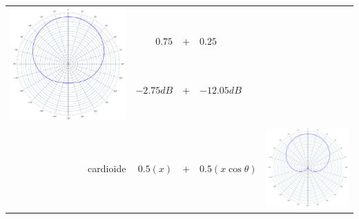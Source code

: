 \begin{table}[ht]
\begin{center}
\begin{tabular}{rrcll}
 \multirow{4}{*}{\begin{minipage}{.25\textwidth}\includegraphics[width=\linewidth]{CAPITOLI/_TIKZ/POLAR/subcardioid}\end{minipage}} \\
                & $0.75$       & $+$ & $0.25$               & \\
                & $-2.75dB$    & $+$ & $-12.05dB$           & \\
& \\
\hline
cardioide       & $0.5(x)$     & $+$ & $0.5(x\cos\theta)$   &
 \multirow{4}{*}{\begin{minipage}{.25\textwidth}\includegraphics[width=\linewidth]{CAPITOLI/_TIKZ/POLAR/cardioid}\end{minipage}} \\

\end{tabular}
\end{center}
\end{table}
